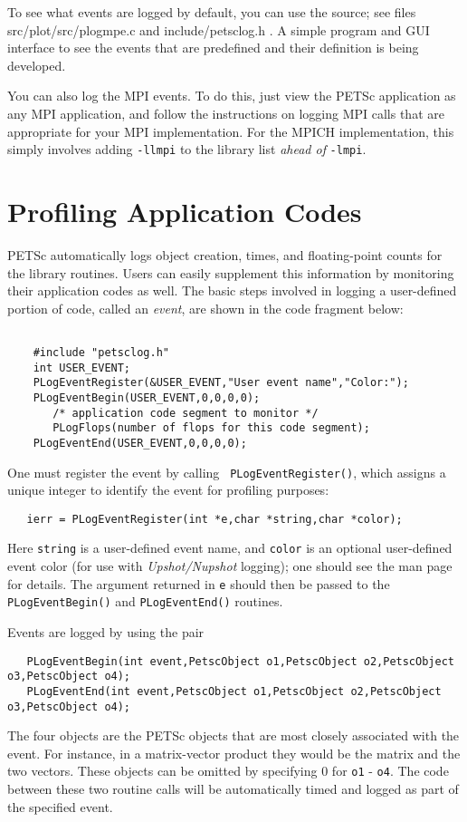 To see what events are logged by default, you can use the source; see
files src/plot/src/plogmpe.c and include/petsclog.h .  A simple program and
GUI interface to see the events that are predefined and their definition is 
being developed.

You can also log the MPI events.  To do this, just view the PETSc application
as any MPI application, and follow the instructions on logging MPI calls that
are appropriate for your MPI implementation.  For the MPICH implementation,
this simply involves adding {\tt -llmpi} to the library list {\em ahead of}
{\tt -lmpi}.  

\section{Profiling Application Codes}
\label{sec:profileuser}

PETSc automatically logs object creation, times, and floating-point
counts for the library routines. Users can easily supplement
this information by monitoring their application codes as well.  
The basic steps involved in logging a
user-defined portion of code, called an {\em event}, are shown in the 
code fragment below:
\begin{verbatim}

    #include "petsclog.h"
    int USER_EVENT;
    PLogEventRegister(&USER_EVENT,"User event name","Color:");
    PLogEventBegin(USER_EVENT,0,0,0,0);
       /* application code segment to monitor */
       PLogFlops(number of flops for this code segment);
    PLogEventEnd(USER_EVENT,0,0,0,0);

\end{verbatim}

One must register the event by calling {\tt
PLogEventRegister()}, which assigns a unique integer to identify the
event for profiling purposes: 
\begin{verbatim}
   ierr = PLogEventRegister(int *e,char *string,char *color);
\end{verbatim}
Here {\tt string} is a user-defined event name, and {\tt color} is an
optional user-defined event color (for use with {\em Upshot/Nupshot} logging);
one should see the man page for details.  The argument returned in {\tt e} should then
be passed to the {\tt PLogEventBegin()} and {\tt PLogEventEnd()}
routines.

Events are logged by using the pair 
\begin{verbatim}
   PLogEventBegin(int event,PetscObject o1,PetscObject o2,PetscObject o3,PetscObject o4);
   PLogEventEnd(int event,PetscObject o1,PetscObject o2,PetscObject o3,PetscObject o4);
\end{verbatim}
The 
four objects are the PETSc objects that are most closely associated 
with the event.  For instance, in a matrix-vector product they 
would be the matrix and the two vectors.  These objects can be omitted
by specifying 0 for {\tt o1} - {\tt o4}.  The code between these 
two routine calls will be automatically timed and logged as part of the
specified event.

